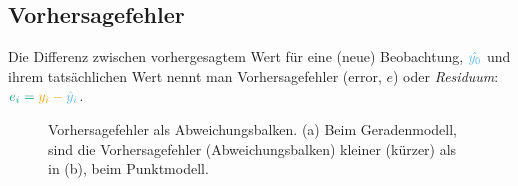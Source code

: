 \documentclass[
  letterpaper,
  oneside,
  open=any]{scrbook}
\theoremstyle{definition}
\theoremstyle{definition}
\theoremstyle{definition}
\theoremstyle{remark}
\begin{document}
\subsection{Vorhersagefehler}\label{vorhersagefehler}

Die Differenz zwischen vorhergesagtem Wert für eine (neue) Beobachtung,
\(\color{modelcol}{\hat{y_0}}\) und ihrem tatsächlichen Wert nennt man
Vorhersagefehler (error, \(e\)) oder \emph{Residuum}:
\(\color{errorcol}{e_i} = \color{ycol}{y_i} - \color{modelcol}{\hat{y}_i}\).

\begin{figure}

\begin{minipage}{0.50\linewidth}



\end{minipage}%
%
\begin{minipage}{0.50\linewidth}



\end{minipage}%

\caption{\label{fig-resid}Vorhersagefehler als Abweichungsbalken. (a)
Beim Geradenmodell, sind die Vorhersagefehler (Abweichungsbalken)
kleiner (kürzer) als in (b), beim Punktmodell.}

\end{figure}%
\end{document}

